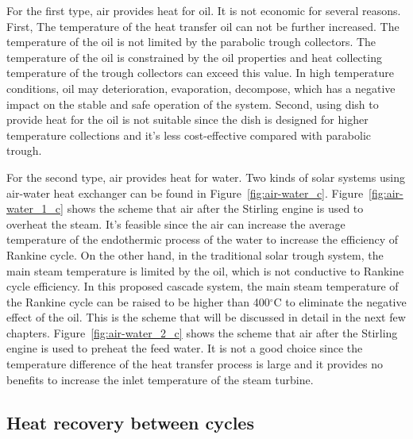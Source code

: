 For the first type, air provides heat for oil. It is not economic for several reasons. First, The temperature of the heat transfer oil can not be further increased. The temperature of the oil is not limited by the parabolic trough collectors. The temperature of the oil is constrained by the oil properties and heat collecting temperature of the trough collectors can exceed this value. In high temperature conditions, oil may deterioration, evaporation, decompose, which has a negative impact on the stable and safe operation of the system. Second, using dish to provide heat for the oil is not suitable since the dish is designed for higher temperature collections and it's less cost-effective compared with parabolic trough.

For the second type, air provides heat for water. Two kinds of solar systems using air-water heat exchanger can be found in Figure~\ref{fig:air-water_c}. Figure~\ref{fig:air-water_1_c} shows the scheme that air after the Stirling engine is used to overheat the steam. It's feasible since the air can increase the average temperature of the endothermic process of the water to increase the efficiency of Rankine cycle. On the other hand, in the traditional solar trough system, the main steam temperature is limited by the oil, which is not conductive to Rankine cycle efficiency. In this proposed cascade system, the main steam temperature of the Rankine cycle can be raised to be higher than 400$\mathrm{^\circ C}$ to eliminate the negative effect of the oil.
This is the scheme that will be discussed in detail in the next few chapters. Figure~\ref{fig:air-water_2_c} shows the scheme that air after the Stirling engine is used to preheat the feed water. It is not a good choice since the temperature difference of the heat transfer process is large and it provides no benefits to increase the inlet temperature of the steam turbine.
 
\subsection{Heat recovery between cycles}


